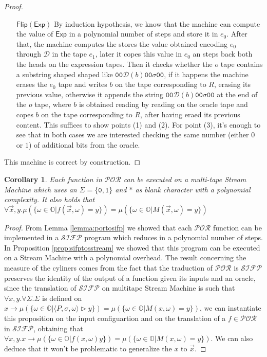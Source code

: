 \documentclass[10pt]{amsart}
\newcommand{\POR}{\mathcal{POR}}
\newcommand{\SIFP}{\mathcal{SIFP}}
\newcommand{\zero}{\mathtt{0}}
\newcommand{\one}{\mathtt{1}}
\newcommand{\OO}{\mathbb{O}}
\newcommand{\db}{\mathcal D}
\newcommand{\xp}{\mathsf{Exp}}
\newcommand{\fl}{\mathsf{Flip}}
\newcommand{\store}{\Sigma}
\newcommand{\ssos}{\triangleright}
\newtheorem{corollary}{Corollary}
\begin{document}
\begin{proof}
\begin{itemize}
\item[$\fl(\xp)$] By induction hypothesis, we know that the machine can compute the value of $\xp$ in a polynomial number of steps and store it in $e_0$. After that, the machine computes the stores the value obtained encoding $e_0$ through $\db$ in the tape $e_1$, later it copes this value in $e_0$ an steps back both the heads on the expression tapes. Then it checks whether the $o$ tape contains a substring shaped shaped like $\zero \zero \db (b)\zero \zero \sigma \zero \zero $, if it happens the machine erases the $e_0$ tape and writes $b$ on the tape corresponding to $R$, erasing its previous value, otherwise it appends the string $\zero \zero \db (b)\zero \zero \sigma \zero \zero$ at the end of the $o$ tape, where $b$ is obtained reading by reading on the oracle tape and copes $b$ on the tape corresponding to $R$, after having eraed its previous content. This suffices to show points (1) and (2). For point (3), it's enough to see that in both cases we are interested checking the same number (either $0$ or $1$) of additional bits from the oracle. 
\end{itemize}

This machine is correct by construction.
\end{proof}

\begin{corollary}
Each function in $\POR$ can be executed on a multi-tape Stream Machine which uses an $\Sigma=\{\zero, \one\}$ and $*$ as blank character with a polynomial complexity. It also holds that $\forall \vec x, y. \mu(\{\omega \in \OO | f(\vec x, \omega) = y\})=\mu(\{\omega \in \OO| M(\vec x, \omega) = y\})$ 
\end{corollary}

\begin{proof}
From Lemma \ref{lemma:portosifp} we showed that each $\POR$ function can be implemented in a $\SIFP$ program which reduces in a polynomial number of steps. In Proposition \ref{prop:sifptosstream} we showed that this program can be executed on a Stream Machine with a polynomial overhead. The result concerning the measure of the cyliners comes from the fact that the traduction of $\POR$ is $\SIFP$ preserves the identity of the output of a function given its inputs and an oracle, since the translation of $\SIFP$ on multitape Stream Machine is such that $\forall x, y.\forall \store.\store$ is defined on $x \to \mu(\{\omega \in \OO | \langle P, \sigma, \omega\rangle \ssos y\})=\mu(\{\omega \in \OO | M(x, \omega)=y\})$, we can instantiate this proposition on the input configuartion and on the translation of a $f \in \POR$ in $\SIFP$, obtaining that $\forall x, y. x \to \mu(\{\omega \in \OO | f(x, \omega) y\})=\mu(\{\omega \in \OO | M(x, \omega)=y\})$. We can also deduce that it won't be problematic to generalize the $x$ to $\vec x$.
\end{proof}
\end{document}
